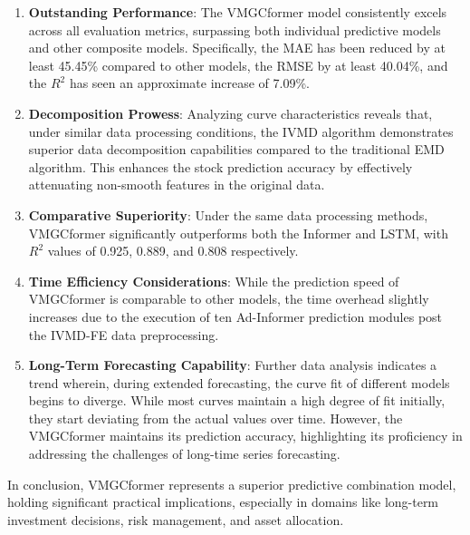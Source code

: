 \documentclass[sn-mathphys,Numbered]{sn-jnl}
\theoremstyle{thmstyleone}%
\theoremstyle{thmstyletwo}%
\theoremstyle{thmstylethree}%
\begin{document}
\begin{enumerate}
\item \textbf{Outstanding Performance}: 
The VMGCformer model consistently excels across all evaluation metrics, surpassing both individual predictive models and other composite models. Specifically, the MAE has been reduced by at least 45.45\% compared to other models, the RMSE by at least 40.04\%, and the \(R^2\) has seen an approximate increase of 7.09\%.
    
\item \textbf{Decomposition Prowess}: 
Analyzing curve characteristics reveals that, under similar data processing conditions, the IVMD algorithm demonstrates superior data decomposition capabilities compared to the traditional EMD algorithm. This enhances the stock prediction accuracy by effectively attenuating non-smooth features in the original data.
    
\item \textbf{Comparative Superiority}:
Under the same data processing methods, VMGCformer significantly outperforms both the Informer and LSTM, with \(R^2\) values of 0.925, 0.889, and 0.808 respectively.
    
\item \textbf{Time Efficiency Considerations}: While the prediction speed of VMGCformer is comparable to other models, the time overhead slightly increases due to the execution of ten Ad-Informer prediction modules post the IVMD-FE data preprocessing.
    
\item \textbf{Long-Term Forecasting Capability}:
Further data analysis indicates a trend wherein, during extended forecasting, the curve fit of different models begins to diverge. While most curves maintain a high degree of fit initially, they start deviating from the actual values over time. However, the VMGCformer maintains its prediction accuracy, highlighting its proficiency in addressing the challenges of long-time series forecasting.
\end{enumerate}

In conclusion, VMGCformer represents a superior predictive combination model, holding significant practical implications, especially in domains like long-term investment decisions, risk management, and asset allocation.
\end{document}
